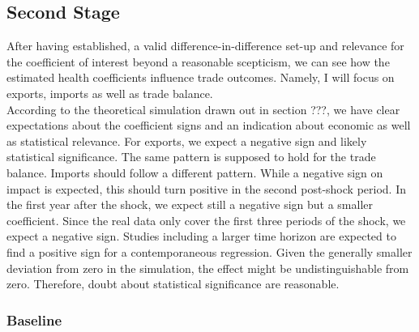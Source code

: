 \documentclass{article}
\begin{document}
\subsection{Second Stage}

After having established, a valid difference-in-difference set-up and relevance for the coefficient of interest beyond a reasonable scepticism, we can see how the estimated health coefficients influence trade outcomes. Namely, I will focus on exports, imports as well as trade balance.\\
According to the theoretical simulation drawn out in section ???, we have clear expectations about the coefficient signs and an indication about economic as well as statistical relevance. For exports, we expect a negative sign and likely statistical significance. The same pattern is supposed to hold for the trade balance. Imports should follow a different pattern. While a negative sign on impact is expected, this should turn positive in the second post-shock period. In the first year after the shock, we expect still a negative sign but a smaller coefficient. Since the real data only cover the first three periods of the shock, we expect a negative sign. Studies including a larger time horizon are expected to find a positive sign for a contemporaneous regression. Given the generally smaller deviation from zero in the simulation, the effect might be undistinguishable from zero. Therefore, doubt about statistical significance are reasonable.

\subsubsection{Baseline}
\end{document}
